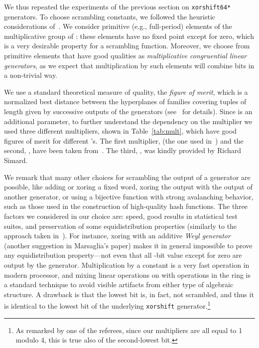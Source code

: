 \documentclass{acmsmalltr}
\newcommand{\xorshift}[1][]{\texttt{xorshift#1}\xspace}
\newcommand{\xorshifts}[1][]{\texttt{xorshift#1*}\xspace}
\begin{document}
\begin{table}
\end{table}

We thus repeated the experiments of the previous section on \xorshifts[64]
generators. To choose scrambling constants, we followed the heuristic
considerations of~\cite{PTVNR}. We consider primitive (e.g., full-period)
elements of the multiplicative group of : these elements have no
fixed point except for zero, which is a very desirable property for a scrambling function.
Moreover, we choose from~
primitive elements that have good qualities as \emph{multiplicative
congruential linear generators}, as we expect that multiplication by such
elements will combine bits in a non-trivial way. 

We use a standard theoretical measure of quality, the \emph{figure of
merit}, which is a normalized best distance between the hyperplanes of families
covering tuples of length  given by successive outputs of the generators 
(see~ for details). Since  is an additional parameter,
to further understand the dependency on the multiplier we used three different
multipliers, shown in Table~\ref{tab:mult}, which have good figures of
merit for different 's. The first multiplier,  (the
one used in~\cite{PTVNR}) and the second, , have been taken
from~. The third, , was kindly provided by Richard
Simard.

We remark that many other choices for scrambling the output of a generator are
possible, like adding or xoring a fixed word, xoring the output with the output
of another generator, or using a bijective function with strong avalanching
behavior, such as those used in the construction of high-quality hash
functions.
The three factors we considered in our choice are: speed,
good results in statistical test suites, and preservation of 
some equidistribution properties (similarly to the approach taken
in~\cite{LEGCGCDF}).
For instance, xoring with an additive \emph{Weyl generator} (another suggestion
in Marsaglia's paper) makes it in general impossible to prove any
equidistribution property---not even that all -bit value except for zero are output by the
generator. Multiplication by a constant is a very fast operation in modern
processor, and mixing linear operations on  with operations in
the ring  is a standard technique to avoid visible artifacts from
either type of algebraic structure. A drawback is that the lowest bit is, in
fact, not scrambled, and thus it is identical to the lowest bit of
the underlying \xorshift generator.\footnote{As remarked by one of the referees,
since our multipliers are all equal to 1 modulo 4, this is true also of the
second-lowest bit.}
\end{document}
